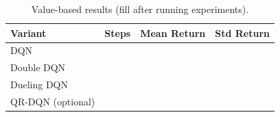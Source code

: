 \begin{table}[h]
\centering
\caption{Value-based results (fill after running experiments).}
\label{tab:dqnresults}
\begin{tabular}{lccc}
\toprule
Variant & Steps & Mean Return & Std Return \\
\midrule
DQN & & & \\
Double DQN & & & \\
Dueling DQN & & & \\
QR-DQN (optional) & & & \\
\bottomrule
\end{tabular}
\end{table}
